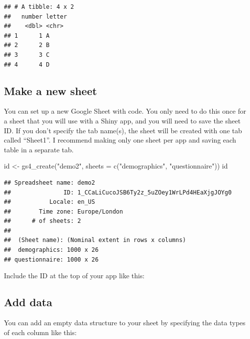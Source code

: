 \documentclass[
  oneside]{book}
\newenvironment{Shaded}{\begin{snugshade}}{\end{snugshade}}
\newcommand{\AttributeTok}[1]{\textcolor[rgb]{0.77,0.63,0.00}{#1}}
\newcommand{\FunctionTok}[1]{\textcolor[rgb]{0.00,0.00,0.00}{#1}}
\newcommand{\NormalTok}[1]{#1}
\newcommand{\OtherTok}[1]{\textcolor[rgb]{0.56,0.35,0.01}{#1}}
\newcommand{\StringTok}[1]{\textcolor[rgb]{0.31,0.60,0.02}{#1}}
\begin{document}
\begin{verbatim}
## # A tibble: 4 x 2
##   number letter
##    <dbl> <chr> 
## 1      1 A     
## 2      2 B     
## 3      3 C     
## 4      4 D
\end{verbatim}

\hypertarget{make-a-new-sheet}{%
\subsection{Make a new sheet}\label{make-a-new-sheet}}

You can set up a new Google Sheet with code. You only need to do this once for a sheet that you will use with a Shiny app, and you will need to save the sheet ID. If you don't specify the tab name(s), the sheet will be created with one tab called ``Sheet1''. I recommend making only one sheet per app and saving each table in a separate tab.

\begin{Shaded}
\begin{Highlighting}[]
\NormalTok{id }\OtherTok{\textless{}{-}} \FunctionTok{gs4\_create}\NormalTok{(}\StringTok{"demo2"}\NormalTok{, }\AttributeTok{sheets =} \FunctionTok{c}\NormalTok{(}\StringTok{"demographics"}\NormalTok{, }\StringTok{"questionnaire"}\NormalTok{))}
\NormalTok{id}
\end{Highlighting}
\end{Shaded}

\begin{verbatim}
## Spreadsheet name: demo2
##               ID: 1_CCaLiCucoJSB6Ty2z_5uZOey1WrLPd4HEaXjgJOYg0
##           Locale: en_US
##        Time zone: Europe/London
##      # of sheets: 2
## 
##  (Sheet name): (Nominal extent in rows x columns)
##  demographics: 1000 x 26
## questionnaire: 1000 x 26
\end{verbatim}

Include the ID at the top of your app like this:

\hypertarget{add-data}{%
\subsection{Add data}\label{add-data}}

You can add an empty data structure to your sheet by specifying the data types of each column like this:
\end{document}

